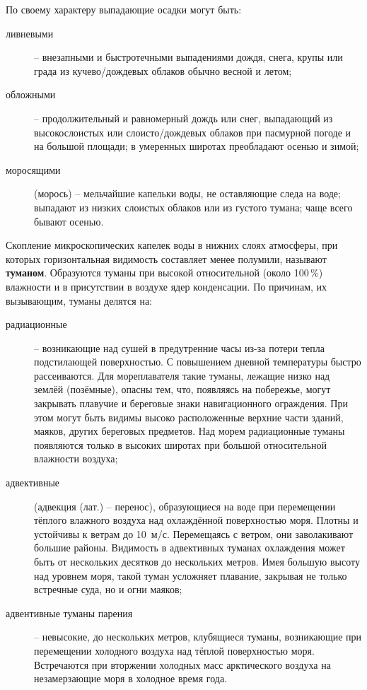 По своему характеру выпадающие осадки могут быть:

\begin{description}
\item[ливневыми] \--- внезапными и быстротечными выпадениями дождя,
  снега, крупы или града из кучево\-/дождевых облаков обычно весной и
  летом;
\item[обложными] \--- продолжительный и равномерный дождь или снег,
  выпадающий из высокослоистых или слоисто\-/дождевых облаков при
  пасмурной погоде и на большой площади; в умеренных широтах
  преобладают осенью и зимой;
\item[моросящими] (морось) \--- мельчайшие капельки воды, не
  оставляющие следа на воде; выпадают из низких слоистых облаков или
  из густого тумана; чаще всего бывают осенью.
\end{description}

Скопление микроскопических капелек воды в нижних слоях атмосферы, при
которых горизонтальная видимость составляет менее полумили, называют
\textbf{туманом}. Образуются туманы при высокой относительной (около
100\,\%) влажности и в присутствии в воздухе ядер конденсации. По
причинам, их вызывающим, туманы делятся на:

\begin{description}
\item[радиационные] \--- возникающие над сушей в предутренние часы
  из-за потери тепла подстилающей поверхностью.  С повышением дневной
  температуры быстро рассеиваются. Для мореплавателя такие туманы,
  лежащие низко над землёй (позёмные), опасны тем, что, появляясь на
  побережье, могут закрывать плавучие и береговые знаки навигационного
  ограждения. При этом могут быть видимы высоко расположенные верхние
  части зданий, маяков, других береговых предметов. Над морем
  радиационные туманы появляются только в высоких широтах при большой
  относительной влажности воздуха;
\item[адвективные] (адвекция (лат.) \--- перенос), образующиеся на
  воде при перемещении тёплого влажного воздуха над охлаждённой
  поверхностью моря. Плотны и устойчивы к ветрам до
  10~м/с. Перемещаясь с ветром, они заволакивают большие
  районы. Видимость в адвективных туманах охлаждения может быть от
  нескольких десятков до нескольких метров. Имея большую высоту над
  уровнем моря, такой туман усложняет плавание, закрывая не только
  встречные суда, но и огни маяков;
\item[адвентивные туманы парения] \--- невысокие, до нескольких
  метров, клубящиеся туманы, возникающие при перемещении холодного
  воздуха над тёплой поверхностью моря. Встречаются при вторжении
  холодных масс арктического воздуха на незамерзающие моря в холодное
  время года.
\end{description}

